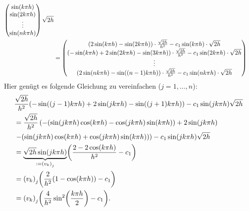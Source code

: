 \documentclass{exercise}
\begin{document}
\begin{enumerate}
\begin{align*}
\begin{pmatrix}
                \sin\parentheses*{k\pi h}\\
                \sin\parentheses*{2k\pi h}\\
                \vdots\\
                \sin\parentheses*{nk\pi h}
            \end{pmatrix}\sqrt{2h}\\
            &= \begin{pmatrix}
                \parentheses*{2\sin\parentheses*{k\pi h} - \sin\parentheses*{2k\pi h}} \cdot \frac{\sqrt{2h}}{h^2} - c_1\sin\parentheses*{k\pi h} \cdot \sqrt{2h}\\
                \parentheses*{-\sin\parentheses*{k\pi h} + 2 \sin\parentheses*{2k\pi h} - \sin\parentheses*{3k\pi h}} \cdot \frac{\sqrt{2h}}{h^2} - c_1\sin\parentheses*{2k\pi h} \cdot \sqrt{2h}\\
                \vdots\\
                \parentheses*{2\sin\parentheses*{nk\pi h} - \sin\parentheses*{\parentheses*{n - 1}k\pi h}} \cdot \frac{\sqrt{2h}}{h^2} - c_1\sin\parentheses*{nk\pi h} \cdot \sqrt{2h}
            \end{pmatrix}
        \end{align*}
        Hier genügt es folgende Gleichung zu vereinfachen (\(j = 1, \ldots, n\)):
        \begin{align*}
            &\frac{\sqrt{2h}}{h^2}\parentheses*{-\sin\parentheses*{\parentheses*{j - 1}k\pi h} + 2\sin\parentheses*{jk\pi h} - \sin\parentheses*{\parentheses*{j + 1}k\pi h}} - c_1\sin\parentheses*{jk\pi h}\sqrt{2h}\\
            &= \frac{\sqrt{2h}}{h^2}\left(-\parentheses*{\sin\parentheses*{jk\pi h}\cos\parentheses*{k\pi h} - \cos\parentheses*{jk\pi h}\sin\parentheses*{k\pi h}} + 2\sin\parentheses*{jk\pi h}\right.\\
            &\left.-\parentheses*{\sin\parentheses*{jk\pi h}\cos\parentheses*{k\pi h} + \cos\parentheses*{jk\pi h}\sin\parentheses*{k\pi h}}\right) - c_1\sin\parentheses*{jk\pi h}\sqrt{2h}\\
            &= \underbrace{\sqrt{2h}\sin\parentheses*{jk\pi h}}_{:= \parentheses*{v_k}_j}\parentheses*{\frac{2 - 2\cos\parentheses*{k\pi h}}{h^2} - c_1}\\
            &= \parentheses*{v_k}_j\parentheses*{\frac{2}{h^2}\parentheses*{1 - \cos\parentheses*{k\pi h}} - c_1}\\
            &= \parentheses*{v_k}_j\parentheses*{\frac{4}{h^2}\sin^2\parentheses*{\frac{k\pi h}{2}} - c_1}.

\end{align*}
\end{enumerate}
\end{document}
